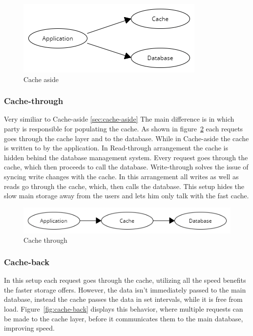 \documentclass[10pt,twoside,a4paper]{article}
\begin{document}
\begin{figure}[h]
    \centering
    \includegraphics[width=0.5\linewidth]{Cache-aside.png}
    \caption{Cache aside}
    \label{fig:cache-aside}
\end{figure}

\subsubsection{Cache-through}
Very similiar to Cache-aside \ref{sec:cache-aside} The main difference is in which party is responsible for populating the cache. As shown in figure~\ref{fig:cache-through} each requets goes through the cache layer and to the database. While in Cache-aside the cache is written to by the application. In Read-through arrangement the cache is hidden behind the database management system. Every request goes through the cache, which then proceeds to call the database. Write-through solves the issue of syncing write changes with the cache. In this arrangement all writes as well as reads go through the cache, which, then calls the database. This setup hides the slow main storage away from the users and lets him only talk with the fast cache.

\begin{figure}[h]
    \centering
    \includegraphics[width=1\linewidth]{Cache-through.png}
    \caption{Cache through}
    \label{fig:cache-through}
\end{figure}

\subsubsection{Cache-back}
In this setup each request goes through the cache, utilizing all the speed benefits the faster storage offers. However, the data isn't immediately passed to the main database, instead the cache passes the data in set intervals, while it is free from load. Figure~\ref{fig:cache-back} displays this behavior, where multiple requests can be made to the cache layer, before it communicates them to the main database, improving speed.
\end{document}
